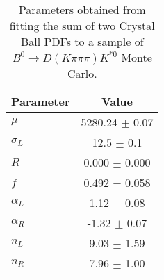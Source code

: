 \begin{table}[h]
  \centering
  \begin{tabular}{lc}
      \toprule
      Parameter & Value \\
      \midrule
      $\mu$ & 5280.24 $\pm$ 0.07 \\
      $\sigma_L$ & 12.5 $\pm$ 0.1 \\
      $R$ & 0.000 $\pm$ 0.000 \\
      $f$ & 0.492 $\pm$ 0.058 \\
      $\alpha_L$ & 1.12 $\pm$ 0.08 \\
      $\alpha_R$ & -1.32 $\pm$ 0.07 \\
      $n_L$ & 9.03 $\pm$ 1.59 \\
      $n_R$ & 7.96 $\pm$ 1.00 \\
  \bottomrule
  \end{tabular}
  \caption{Parameters obtained from fitting the sum of two Crystal Ball PDFs to a sample of $B^0 \to D(K\pi\pi\pi)K^{*0}$ Monte Carlo.}
\label{tab:signal_Kpipipi_MC_params}
\end{table}
